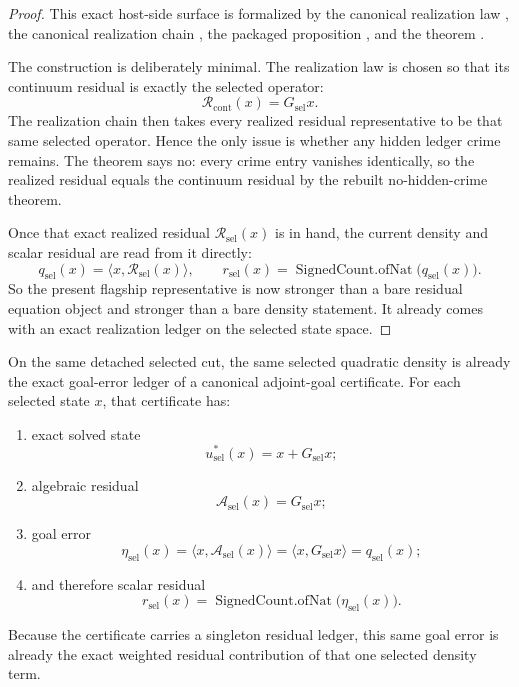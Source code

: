 \begin{proof}
This exact host-side surface is formalized by the canonical realization law
, the
canonical realization chain
, the
packaged proposition , and the
theorem .

The construction is deliberately minimal. The realization law is chosen so
that its continuum residual is exactly the selected operator:
\[
\mathcal R_{\mathrm{cont}}(x)=G_{\mathrm{sel}}x.
\]
The realization chain then takes every realized residual representative to be
that same selected operator. Hence the only issue is whether any hidden ledger
crime remains. The theorem says no: every crime entry vanishes identically, so
the realized residual equals the continuum residual by the rebuilt
no-hidden-crime theorem.

Once that exact realized residual \(\mathcal R_{\mathrm{sel}}(x)\) is in hand,
the current density and scalar residual are read from it directly:
\[
q_{\mathrm{sel}}(x)=\langle x,\mathcal R_{\mathrm{sel}}(x)\rangle,
\qquad
r_{\mathrm{sel}}(x)=\operatorname{SignedCount.ofNat}\!\bigl(q_{\mathrm{sel}}(x)\bigr).
\]
So the present flagship representative is now stronger than a bare residual
equation object and stronger than a bare density statement. It already comes
with an exact realization ledger on the selected state space.
\end{proof}

\begin{theorem}
\label{thm:the-selected-quadratic-density-is-already-an-exact-adjoint-goal-ledger}
On the same detached selected cut, the same selected quadratic density is
already the exact goal-error ledger of a canonical adjoint-goal certificate.
For each selected state \(x\), that certificate has:
\begin{enumerate}
\item exact solved state
\[
u^\ast_{\mathrm{sel}}(x)=x+G_{\mathrm{sel}}x;
\]
\item algebraic residual
\[
\mathcal A_{\mathrm{sel}}(x)=G_{\mathrm{sel}}x;
\]
\item goal error
\[
\eta_{\mathrm{sel}}(x)
  =\langle x,\mathcal A_{\mathrm{sel}}(x)\rangle
  =\langle x,G_{\mathrm{sel}}x\rangle
  =q_{\mathrm{sel}}(x);
\]
\item and therefore scalar residual
\[
r_{\mathrm{sel}}(x)
  =\operatorname{SignedCount.ofNat}\!\bigl(\eta_{\mathrm{sel}}(x)\bigr).
\]
\end{enumerate}
Because the certificate carries a singleton residual ledger, this same goal
error is already the exact weighted residual contribution of that one selected
density term.
\end{theorem}

